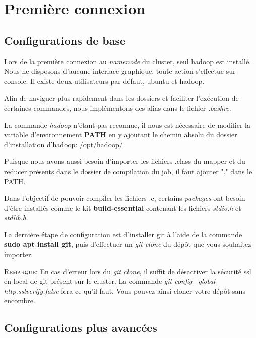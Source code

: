 \section{Première connexion}

\subsection{Configurations de base}
Lors de la première connexion au \textit{namenode} du cluster, seul hadoop est installé. Nous ne disposons d'aucune interface graphique, toute action s'effectue sur console. Il existe deux utilisateurs par défaut, ubuntu et hadoop.\par
Afin de naviguer plus rapidement dans les dossiers et faciliter l'exécution de certaines commandes, nous implémentons des alias dans le fichier \textit{.bashrc}.\par
La commande \textit{hadoop} n'étant pas reconnue, il nous est nécessaire de modifier la variable d'environnement \textbf{PATH} en y ajoutant le chemin absolu du dossier d'installation d'hadoop: /opt/hadoop/\par
Puisque nous avons aussi besoin d'importer les fichiers .class du mapper et du reducer présents dans le dossier de compilation du job, il faut ajouter "." dans le PATH.\par
Dans l'objectif de pouvoir compiler les fichiers .c, certains \textit{packages} ont besoin d'être installés comme le kit \textbf{build-essential} contenant les fichiers \textit{stdio.h} et \textit{stdlib.h}.\par
La dernière étape de configuration est d'installer git à l'aide de la commande \textbf{sudo apt install git}, puis d'effectuer un \textit{git clone} du dépôt que vous souhaitez importer.\par
\vspace{0.5\baselineskip}

\textsc{Remarque:} En cas d'erreur lors du \textit{git clone}, il suffit de désactiver la sécurité ssl en local de git présent sur le cluster. La commande \textit{git config --global http.sslverify.false} fera ce qu'il faut. Vous pouvez ainsi cloner votre dépôt sans encombre.\par
\vspace{1.5\baselineskip}

\subsection{Configurations plus avancées}

